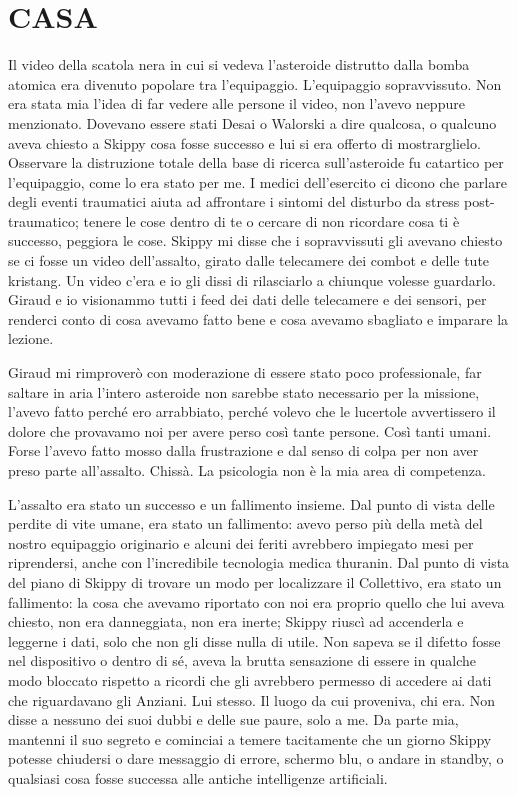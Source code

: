 \chapter{CASA}\label{casa}

\hfill\break

Il video della scatola nera in cui si vedeva l'asteroide distrutto dalla
bomba atomica era divenuto popolare tra l'equipaggio. L'equipaggio
sopravvissuto. Non era stata mia l'idea di far vedere alle persone il
video, non l'avevo neppure menzionato. Dovevano essere stati Desai o
Walorski a dire qualcosa, o qualcuno aveva chiesto a Skippy cosa fosse
successo e lui si era offerto di mostrarglielo. Osservare la distruzione
totale della base di ricerca sull'asteroide fu catartico per
l'equipaggio, come lo era stato per me. I medici dell'esercito ci dicono
che parlare degli eventi traumatici aiuta ad affrontare i sintomi del
disturbo da stress post-traumatico; tenere le cose dentro di te o
cercare di non ricordare cosa ti è successo, peggiora le cose. Skippy mi
disse che i sopravvissuti gli avevano chiesto se ci fosse un video
dell'assalto, girato dalle telecamere dei combot e delle tute kristang.
Un video c'era e io gli dissi di rilasciarlo a chiunque volesse
guardarlo. Giraud e io visionammo tutti i feed dei dati delle telecamere
e dei sensori, per renderci conto di cosa avevamo fatto bene e cosa
avevamo sbagliato e imparare la lezione.

Giraud mi rimproverò con moderazione di essere stato poco professionale,
far saltare in aria l'intero asteroide non sarebbe stato necessario per
la missione, l'avevo fatto perché ero arrabbiato, perché volevo che le
lucertole avvertissero il dolore che provavamo noi per avere perso così
tante persone. Così tanti umani. Forse l'avevo fatto mosso dalla
frustrazione e dal senso di colpa per non aver preso parte all'assalto.
Chissà. La psicologia non è la mia area di competenza.

L'assalto era stato un successo e un fallimento insieme. Dal punto di
vista delle perdite di vite umane, era stato un fallimento: avevo perso
più della metà del nostro equipaggio originario e alcuni dei feriti
avrebbero impiegato mesi per riprendersi, anche con l'incredibile
tecnologia medica thuranin. Dal punto di vista del piano di Skippy di
trovare un modo per localizzare il Collettivo, era stato un fallimento:
la cosa che avevamo riportato con noi era proprio quello che lui aveva
chiesto, non era danneggiata, non era inerte; Skippy riuscì ad
accenderla e leggerne i dati, solo che non gli disse nulla di utile. Non
sapeva se il difetto fosse nel dispositivo o dentro di sé, aveva la
brutta sensazione di essere in qualche modo bloccato rispetto a ricordi
che gli avrebbero permesso di accedere ai dati che riguardavano gli
Anziani. Lui stesso. Il luogo da cui proveniva, chi era. Non disse a
nessuno dei suoi dubbi e delle sue paure, solo a me. Da parte mia,
mantenni il suo segreto e cominciai a temere tacitamente che un giorno
Skippy potesse chiudersi o dare messaggio di errore, schermo blu, o
andare in standby, o qualsiasi cosa fosse successa alle antiche
intelligenze artificiali.

